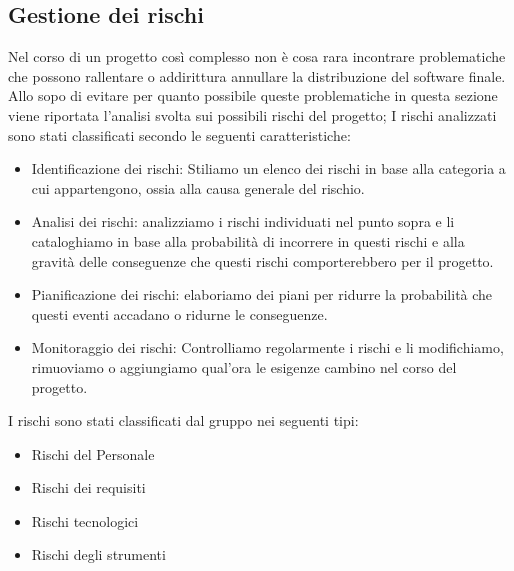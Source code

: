 \documentclass[../piano-di-progetto.tex]{subfiles}
\begin{document}
	\subsection{Gestione dei rischi}%
  \label{sub:gestione_dei_rischi}
  Nel corso di un progetto così complesso non è cosa rara incontrare problematiche che possono rallentare o addirittura annullare la distribuzione del software finale.
  Allo sopo di evitare per quanto possibile queste problematiche in questa sezione viene riportata l'analisi svolta sui possibili rischi del progetto; I rischi analizzati sono stati classificati secondo le seguenti caratteristiche:
  \begin{itemize}
      \item Identificazione dei rischi: Stiliamo un elenco dei rischi in base alla categoria a cui appartengono, ossia alla causa generale del rischio.
      \item Analisi dei rischi: analizziamo i rischi individuati nel punto sopra e li cataloghiamo in base alla probabilità di incorrere in questi rischi e alla gravità delle conseguenze che questi rischi comporterebbero per il progetto.
      \item Pianificazione dei rischi: elaboriamo dei piani per ridurre la probabilità che questi eventi accadano o ridurne le conseguenze.
      \item Monitoraggio dei rischi: Controlliamo regolarmente i rischi e li modifichiamo, rimuoviamo o aggiungiamo qual'ora le esigenze cambino nel corso del progetto.
    \end{itemize}
    I rischi sono stati classificati dal gruppo nei seguenti tipi:
    \begin{itemize}
      \item Rischi del Personale
      \item Rischi dei requisiti
      \item Rischi tecnologici
      \item Rischi degli strumenti
    \end{itemize}
\end{document}
